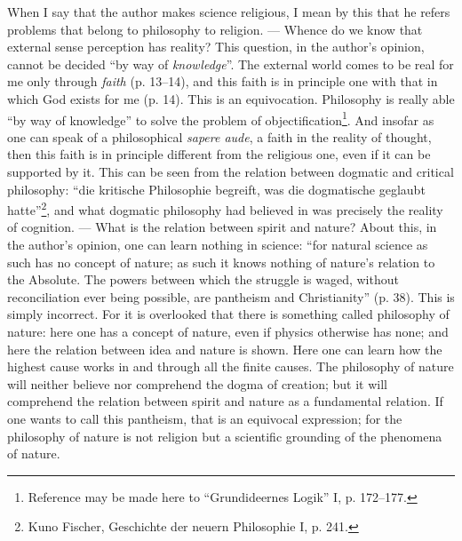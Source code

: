 \documentclass[12pt,a4paper]{book}
\newcommand{\opage}[1]{\marginnote{\footnotesize\textit{[#1]}}}
\begin{document}
When I say that the author makes science religious, I
mean by this that he refers problems that belong to
philosophy to religion. --- Whence do we know that external
sense perception has reality? This question, in the author's
opinion, cannot be decided ``by way of \emph{knowledge}''. The external world
comes to be real for me only through \emph{faith} (p. 13--14), and
this faith is in principle one with that in which God exists
for me (p. 14). This is an equivocation. Philosophy
is really able ``by way of knowledge'' to solve the problem of objectification\footnote{Reference may be made here to ``Grundideernes Logik'' I, p. 172--177.}.
And insofar as one can speak of a philosophical
\opage{7}\setcounter{footnote}{0}%
\textit{sapere aude}, a faith in the reality of thought, then
this faith is in principle different from the religious one, even
if it can be supported by it. This can be seen from the relation
between dogmatic and critical philosophy: ``die kritische
Philosophie begreift, was die dogmatische geglaubt hatte''\footnote{Kuno Fischer, Geschichte der neuern Philosophie I, p. 241.},
and what dogmatic philosophy had believed in was precisely
the reality of cognition. --- What is the relation between spirit
and nature? About this, in the author's opinion, one can learn nothing
in science: ``for natural science as such has
no concept of nature; as such it knows nothing of
nature's relation to the Absolute. The powers between which
the struggle is waged, without reconciliation ever being possible, are
pantheism and Christianity'' (p. 38). This is simply
incorrect. For it is overlooked that there is something called
philosophy of nature: here one has a concept of nature, even if physics
otherwise has none; and here the relation between idea and nature is shown.
Here one can learn how the highest cause works in and
through all the finite causes. The philosophy of nature will neither
believe nor comprehend the dogma of creation; but it will comprehend the relation
between spirit and nature as a fundamental relation. If
one wants to call this pantheism, that is an equivocal expression;
for the philosophy of nature is not religion but a scientific
grounding of the phenomena of nature.
\end{document}
